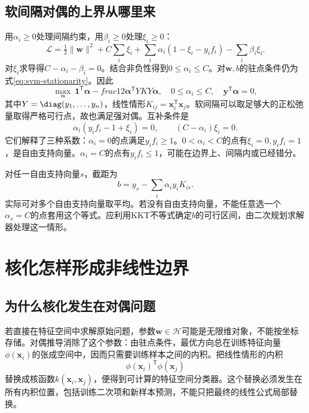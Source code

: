\subsection{软间隔对偶的上界从哪里来}
用$\alpha_i\ge0$处理间隔约束，用$\beta_i\ge0$处理$\xi_i\ge0$：
\begin{equation}
 \mathcal L=\tfrac12\|\bm w\|^2+C\sum_i\xi_i
 +\sum_i\alpha_i(1-\xi_i-y_if_i)-\sum_i\beta_i\xi_i.
\end{equation}
对$\xi_i$求导得$C-\alpha_i-\beta_i=0$。结合非负性得到$0\le\alpha_i\le C$。对$\bm w,b$的驻点条件仍为式\eqref{eq:svm-stationarity}。因此
\begin{equation}
 \max_{\bm\alpha}\ \bm1^{\mathsf T}\bm\alpha-	frac12\bm\alpha^{\mathsf T}YKY\bm\alpha,
 \quad 0\le\alpha_i\le C,\quad \bm y^{\mathsf T}\bm\alpha=0,
 \label{eq:svm-dual}
\end{equation}
其中$Y=\diag(y_1,\ldots,y_n)$，线性情形$K_{ij}=\bm x_i^{\mathsf T}\bm x_j$。软间隔可以取足够大的正松弛量取得严格可行点，故也满足强对偶。互补条件是
\begin{equation}
 \alpha_i(y_if_i-1+\xi_i)=0,\qquad (C-\alpha_i)\xi_i=0.
\end{equation}
它们解释了三种系数：$\alpha_i=0$的点满足$y_if_i\ge1$。$0<\alpha_i<C$的点有$\xi_i=0,y_if_i=1$，是自由支持向量。$\alpha_i=C$的点有$y_if_i\le1$，可能在边界上、间隔内或已经错分。

对任一自由支持向量$s$，截距为
\begin{equation}
 b=y_s-\sum_i\alpha_i y_i K_{is}.
 \label{eq:svm-bias}
\end{equation}
实际可对多个自由支持向量取平均。若没有自由支持向量，不能任意选一个$\alpha_s=C$的点套用这个等式。应利用KKT不等式确定$b$的可行区间，由二次规划求解器处理这一情形。

\section{核化怎样形成非线性边界}
\subsection{为什么核化发生在对偶问题}
若直接在特征空间中求解原始问题，参数$\bm w\in\mathcal H$可能是无限维对象，不能按坐标存储。对偶推导消除了这个参数：由驻点条件，最优方向总在训练特征向量$\phi(\bm x_i)$的张成空间中，因而只需要训练样本之间的内积。把线性情形的内积
\[
 \phi(\bm x_i)^{\mathsf T}\phi(\bm x_j)
\]
替换成核函数$k(\bm x_i,\bm x_j)$，便得到可计算的特征空间分类器。这个替换必须发生在所有内积位置，包括训练二次项和新样本预测，不能只把最终的线性公式局部替换。

